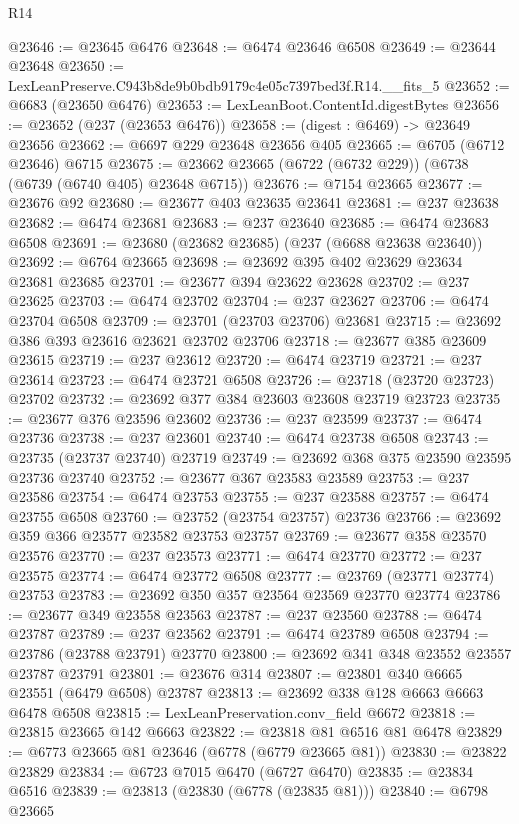 \begin{lexlean}{R14}
\begin{coremodule}
@23646 := @23645 @6476
@23648 := @6474 @23646 @6508
@23649 := @23644 @23648
@23650 := LexLeanPreserve.C943b8de9b0bdb9179c4e05c7397bed3f.R14.__fits_5
@23652 := @6683 (@23650 @6476)
@23653 := LexLeanBoot.ContentId.digestBytes
@23656 := @23652 (@237 (@23653 @6476))
@23658 := (digest : @6469) -> @23649 @23656
@23662 := @6697 @229 @23648 @23656 @405
@23665 := @6705 (@6712 @23646) @6715
@23675 := @23662 @23665 (@6722 (@6732 @229)) (@6738 (@6739 (@6740 @405) @23648 @6715))
@23676 := @7154 @23665
@23677 := @23676 @92
@23680 := @23677 @403 @23635 @23641
@23681 := @237 @23638
@23682 := @6474 @23681
@23683 := @237 @23640
@23685 := @6474 @23683 @6508
@23691 := @23680 (@23682 @23685) (@237 (@6688 @23638 @23640))
@23692 := @6764 @23665
@23698 := @23692 @395 @402 @23629 @23634 @23681 @23685
@23701 := @23677 @394 @23622 @23628
@23702 := @237 @23625
@23703 := @6474 @23702
@23704 := @237 @23627
@23706 := @6474 @23704 @6508
@23709 := @23701 (@23703 @23706) @23681
@23715 := @23692 @386 @393 @23616 @23621 @23702 @23706
@23718 := @23677 @385 @23609 @23615
@23719 := @237 @23612
@23720 := @6474 @23719
@23721 := @237 @23614
@23723 := @6474 @23721 @6508
@23726 := @23718 (@23720 @23723) @23702
@23732 := @23692 @377 @384 @23603 @23608 @23719 @23723
@23735 := @23677 @376 @23596 @23602
@23736 := @237 @23599
@23737 := @6474 @23736
@23738 := @237 @23601
@23740 := @6474 @23738 @6508
@23743 := @23735 (@23737 @23740) @23719
@23749 := @23692 @368 @375 @23590 @23595 @23736 @23740
@23752 := @23677 @367 @23583 @23589
@23753 := @237 @23586
@23754 := @6474 @23753
@23755 := @237 @23588
@23757 := @6474 @23755 @6508
@23760 := @23752 (@23754 @23757) @23736
@23766 := @23692 @359 @366 @23577 @23582 @23753 @23757
@23769 := @23677 @358 @23570 @23576
@23770 := @237 @23573
@23771 := @6474 @23770
@23772 := @237 @23575
@23774 := @6474 @23772 @6508
@23777 := @23769 (@23771 @23774) @23753
@23783 := @23692 @350 @357 @23564 @23569 @23770 @23774
@23786 := @23677 @349 @23558 @23563
@23787 := @237 @23560
@23788 := @6474 @23787
@23789 := @237 @23562
@23791 := @6474 @23789 @6508
@23794 := @23786 (@23788 @23791) @23770
@23800 := @23692 @341 @348 @23552 @23557 @23787 @23791
@23801 := @23676 @314
@23807 := @23801 @340 @6665 @23551 (@6479 @6508) @23787
@23813 := @23692 @338 @128 @6663 @6663 @6478 @6508
@23815 := LexLeanPreservation.conv_field @6672
@23818 := @23815 @23665 @142 @6663
@23822 := @23818 @81 @6516 @81 @6478
@23829 := @6773 @23665 @81 @23646 (@6778 (@6779 @23665 @81))
@23830 := @23822 @23829
@23834 := @6723 @7015 @6470 (@6727 @6470)
@23835 := @23834 @6516
@23839 := @23813 (@23830 (@6778 (@23835 @81)))
@23840 := @6798 @23665

\end{coremodule}
\end{lexlean}
